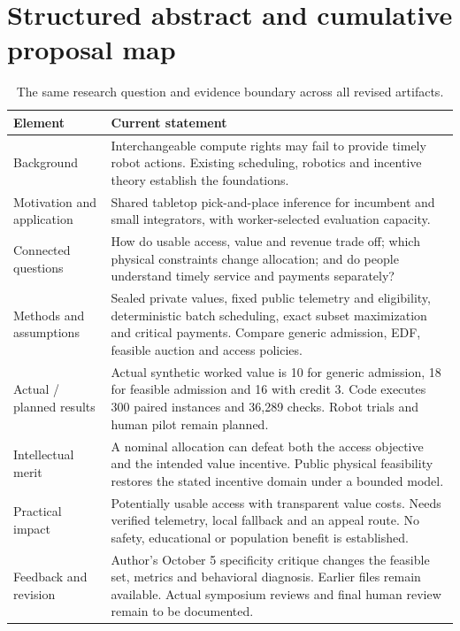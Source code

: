 \section{Structured abstract and cumulative proposal map}
\begin{table}[h]\small
\begin{tabularx}{\textwidth}{p{}Y}\toprule
Element & Current statement\\\midrule
Background & Interchangeable compute rights may fail to provide timely robot actions. Existing scheduling, robotics and incentive theory establish the foundations.\\
Motivation and application & Shared tabletop pick-and-place inference for incumbent and small integrators, with worker-selected evaluation capacity.\\
Connected questions & How do usable access, value and revenue trade off; which physical constraints change allocation; and do people understand timely service and payments separately?\\
Methods and assumptions & Sealed private values, fixed public telemetry and eligibility, deterministic batch scheduling, exact subset maximization and critical payments. Compare generic admission, EDF, feasible auction and access policies.\\
Actual / planned results & Actual synthetic worked value is 10 for generic admission, 18 for feasible admission and 16 with credit 3. Code executes 300 paired instances and 36,289 checks. Robot trials and human pilot remain planned.\\
Intellectual merit & A nominal allocation can defeat both the access objective and the intended value incentive. Public physical feasibility restores the stated incentive domain under a bounded model.\\
Practical impact & Potentially usable access with transparent value costs. Needs verified telemetry, local fallback and an appeal route. No safety, educational or population benefit is established.\\
Feedback and revision & Author's October 5 specificity critique changes the feasible set, metrics and behavioral diagnosis. Earlier files remain available. Actual symposium reviews and final human review remain to be documented.\\\bottomrule
\end{tabularx}
\caption{The same research question and evidence boundary across all revised artifacts.}
\end{table}
\clearpage\twocolumn
